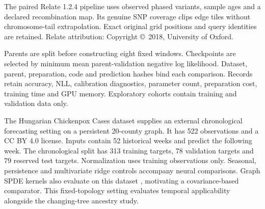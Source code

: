 \documentclass[letterpaper]{article}
\begin{document}
The paired Relate 1.2.4 pipeline uses observed phased variants, sample ages and a declared recombination map. Its genuine SNP coverage clips edge tiles without chromosome-tail extrapolation. Exact original grid positions and query identities are retained. Relate attribution: Copyright \copyright\ 2018, University of Oxford.

Parents are split before constructing eight fixed windows. Checkpoints are selected by minimum mean parent-validation negative log likelihood. Dataset, parent, preparation, code and prediction hashes bind each comparison. Records retain accuracy, NLL, calibration diagnostics, parameter count, preparation cost, training time and GPU memory. Exploratory cohorts contain training and validation data only.

The Hungarian Chickenpox Cases dataset supplies an external chronological forecasting setting on a persistent 20-county graph. It has 522 observations and a CC BY 4.0 license. Inputs contain 52 historical weeks and predict the following week. The chronological split has 313 training targets, 78 validation targets and 79 reserved test targets. Normalization uses training observations only. Seasonal, persistence and multivariate ridge controls accompany neural comparisons. Graph SPDE kernels also evaluate on this dataset \citep{graphspde2022}, motivating a covariance-based comparator. This fixed-topology setting evaluates temporal applicability alongside the changing-tree ancestry study.


\end{document}
